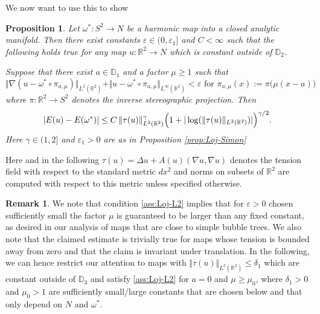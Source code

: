\documentclass[10pt,reqno]{amsart}
\theoremstyle{plain}
\newtheorem{prop}[lemma]{Proposition}
\theoremstyle{definition}
\newtheorem{rmk}[lemma]{Remark}
\numberwithin{equation}{section}
\newcommand{\ga}{\gamma}
\newcommand{\de}{\delta}
\newcommand{\om}{\omega}
\newcommand{\D}{\mathbb{D}}
\newcommand{\R}{\ensuremath{{\mathbb R}}}
\newcommand{\norm}[1]{\Vert#1\Vert}
\newcommand{\beq}{\begin{equation}}
\newcommand{\eeq}{\end{equation}}
\newcommand{\abs}[1]{\vert#1\vert}
\newcommand{\eps}{\varepsilon}
\newcommand{\na}{\nabla}
\begin{document}
We now want to use this to show

\begin{prop}\label{prop:Loj-L^2}
Let $\om^* : S^2 \to N$ be a harmonic map into a closed analytic manifold.
Then there exist constants $\eps\in(0,\eps_1]$ and $C<\infty$ 
such that the following holds true for any map 
$u:\R^2\to N$ which
is constant outside of $\D_2$.

Suppose that 
there exist $a\in\D_1$ and a factor $\mu\geq 1$ such that
\beq
\label{ass:Loj-L2}
\norm{\na(u-\om^*\circ \pi_{a,\mu})}_{L^2(\R^2)} + \norm{u-\om^*\circ \pi_{a,\mu}}_{L^\infty(\R^2)}
<\eps \text{ for } \pi_{a,\mu}(x):=\pi\bigl(\mu(x-a)\bigr)
\eeq
where $\pi:\R^2\to S^2$ denotes the inverse stereographic projection. Then
\beq \label{claim:Loj-L2}
\abs{E(u)-E(\om^*)}
\leq
C\,\norm{\tau(u)}_{L^2(\R^2)}^{\ga}
\Bigl(1+\abs{\log(\norm{\tau(u)}_{L^2(\R^2)})}\Bigr)^{\ga/2}.
\eeq
Here $\gamma\in (1,2]$ and $\eps_1>0$ are as in Proposition \ref{prop:Loj-Simon}
\end{prop}

Here and in the following $\tau(u)=\Delta u+A(u)(\na u,\na u)$ denotes the tension field with respect to the standard
metric $dx^2$ and norms on subsets of $\R^2$ are computed with respect to this
metric unless specified otherwise. 


\begin{rmk} \label{rmk:mu-large}
We note that condition \eqref{ass:Loj-L2} implies that  for $\eps>0$ chosen sufficiently small the factor $\mu$ is guaranteed to be larger than any fixed constant, as desired in our analysis of maps that are close to simple bubble trees. We also note that the claimed estimate is trivially true for maps whose tension is bounded away from zero and that the claim is invariant under translation. In the following, we can hence restrict our attention to maps with
$\norm{\tau(u)}_{L^2(\R^2)}\leq \de_1$
which are constant outside of $\D_3$ and satisfy \eqref{ass:Loj-L2} for $a=0$ and $\mu\geq \mu_0$, where $\de_1>0$ and $\mu_0 >1$ are sufficiently small/large constants that are chosen below and that only depend on $N$ and $\om^*$. 
\end{rmk}
\end{document}
